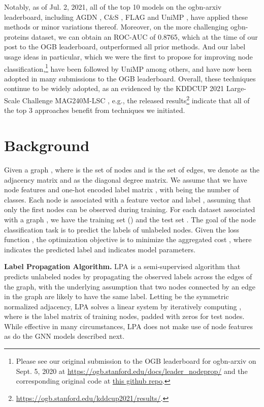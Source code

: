 \documentclass[sigconf,screen,nonacm]{acmart} \usepackage{booktabs}
\newcommand{\minisection}[1]{\vspace{5pt}\noindent\textbf{#1.}}
\begin{document}
Notably, as of Jul. 2, 2021, all of the top 10 models on the ogbn-arxiv leaderboard, including AGDN \citep{sun2020adaptive}, C\&S \citep{huang2020combining}, FLAG \citep{kong2020flag} and UniMP \citep{shi2020masked}, have applied these methods or minor variations thereof.
	Moreover, on the more challenging ogbn-proteins dataset, we can obtain an ROC-AUC of 0.8765, which at the time of our post to the OGB leaderboard, outperformed all prior methods.
And our label usage ideas in particular, which we were the first to propose for improving node classification,\footnote{Please see our original submission to the OGB leaderboard for ogbn-arxiv on Sept. 5, 2020 at \href{https://ogb.stanford.edu/docs/leader_nodeprop/}{https://ogb.stanford.edu/docs/leader\_nodeprop/} and the corresponding original code at \href{https://github.com/dmlc/dgl/tree/1a131f6b9db21b5183a65c3c75a6ed122345b616/examples/pytorch/ogb/ogbn-arxiv}{this github repo}.} have been followed by UniMP \citep{shi2020masked} among others, and have now been adopted in many submissions to the OGB leaderboard.  Overall, these techniques continue to be widely adopted, as an evidenced by the KDDCUP 2021 Large-Scale Challenge MAG240M-LSC \citep{hu2021ogb}, e.g., the released results\footnote{\url{https://ogb.stanford.edu/kddcup2021/results/}.} indicate that all of the top 3 approaches benefit from techniques we initiated. 


\section{Background} \label{sec:background}
Given a graph , where  is the set of nodes and  is the set of edges, we denote  as the adjacency matrix and  as the diagonal degree matrix.
We assume that we have node features  and one-hot encoded label matrix , with  being the number of classes. Each node is associated with a feature vector  and label , assuming that only the first  nodes  can be observed during training.
	For each dataset  associated with a graph , we have the training set  () and the test set .
	The goal of the node classification task is to predict the labels of unlabeled nodes.
	Given the loss function , the optimization objective is to minimize the aggregated cost , where  indicates the predicted label and  indicates model parameters.
	
	\minisection{Label Propagation Algorithm}
	LPA is a semi-supervised algorithm that predicts unlabeled nodes by propagating the observed labels across the edges of the graph, with the underlying assumption that two nodes connected by an edge in the graph are likely to have the same label.
	Letting  be the symmetric normalized adjacency, LPA solves a linear system  by iteratively computing , where  is the label matrix of training nodes, padded with zeros for test nodes.
While effective in many circumstances, LPA does not make use of node features as do the GNN models described next.
	
\end{document}
